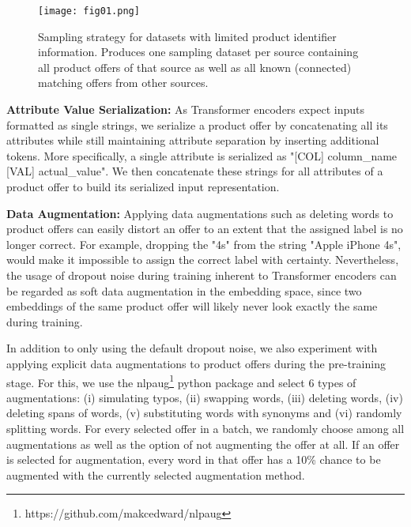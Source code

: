 \documentclass[sigconf]{acmart}
\begin{document}
\begin{figure}[htb]
  \centering
  \texttt{[image: fig01.png]}
  \caption{Sampling strategy for datasets with limited product identifier information. Produces one sampling dataset per source containing all product offers of that source as well as all known (connected) matching offers from other sources.}
  \label{fig:samplingstrat}
\end{figure}

\textbf{Attribute Value Serialization:} 
As Transformer encoders expect inputs formatted as single strings, we serialize a product offer by concatenating all its attributes while still maintaining attribute separation by inserting additional tokens. More specifically, a single attribute is serialized as "[COL] column\_name [VAL] actual\_value". We then concatenate these strings for all attributes of a product offer to build its serialized input representation.

\textbf{Data Augmentation:} Applying data augmentations such as deleting words to product offers can easily distort an offer to an extent that the assigned label is no longer correct. For example, dropping the "4s" from the string "Apple iPhone 4s", would make it impossible to assign the correct label with certainty. Nevertheless, the usage of dropout noise during training inherent to Transformer encoders can be regarded as soft data augmentation in the embedding space, since two embeddings of the same product offer will likely never look exactly the same during training. 

In addition to only using the default dropout noise, we also experiment with applying explicit data augmentations to product offers during the pre-training stage. For this, we use the nlpaug\footnote{https://github.com/makcedward/nlpaug} python package and select 6 types of augmentations: (i) simulating typos, (ii) swapping words, (iii) deleting words, (iv) deleting spans of words, (v) substituting words with synonyms and (vi) randomly splitting words. For every selected offer in a batch, we randomly choose among all augmentations as well as the option of not augmenting the offer at all. If an offer is selected for augmentation, every word in that offer has a 10\% chance to be augmented with the currently selected augmentation method.
\end{document}
